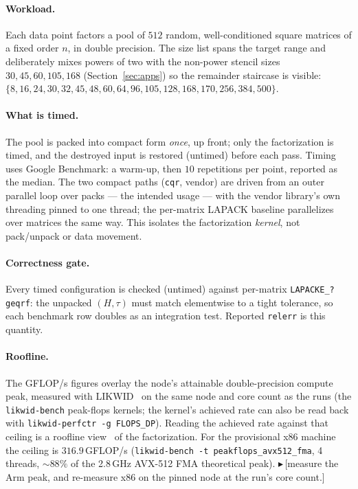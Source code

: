 \documentclass[11pt]{article}
\newif\ifdraftmode \draftmodetrue
\newcommand{\draftnote}[1]{\ifdraftmode{\textcolor{orange!85!black}{\small$\blacktriangleright$\,\textsf{[#1]}}}\fi}
\newcommand{\code}[1]{\texttt{#1}}
\newcommand{\cqr}{\mbox{\texttt{cqr}}}
\begin{document}
\paragraph{Workload.}
Each data point factors a pool of $512$ random, well-conditioned square matrices
of a fixed order $n$, in double precision. The
size list spans the target range and deliberately mixes powers of two with the
non-power stencil sizes $30,45,60,105,168$ (Section~\ref{sec:apps}) so the
remainder staircase is visible: $\{8,16,24,30,32,45,48,60,64,96,105,128,168,170,256,384,500\}$.

\paragraph{What is timed.}
The pool is packed into compact form \emph{once}, up front; only the
factorization is timed, and the destroyed input is restored (untimed) before each
pass. Timing uses Google Benchmark: a warm-up, then $10$ repetitions per point,
reported as the median. The two compact
paths (\cqr{}, vendor) are driven from an outer parallel loop over packs --- the
intended usage --- with the vendor library's own threading pinned to one thread;
the per-matrix LAPACK baseline parallelizes over matrices the same way. This
isolates the factorization \emph{kernel}, not pack/unpack or data movement.

\paragraph{Correctness gate.}
Every timed configuration is checked (untimed) against per-matrix
\code{LAPACKE\_?geqrf}: the unpacked $(H,\tau)$ must match elementwise to a tight
tolerance, so each benchmark row doubles as an integration test. Reported
\code{relerr} is this quantity.

\paragraph{Roofline.}
The GFLOP/s figures overlay the node's attainable double-precision compute
peak, measured with LIKWID~\cite{likwid2010} on the same node and core count as
the runs (the \code{likwid-bench} peak-flops kernels; the kernel's achieved rate
can also be read back with \code{likwid-perfctr -g FLOPS\_DP}). Reading the
achieved rate against that ceiling is a roofline view~\cite{roofline2009} of the
factorization. For the provisional x86 machine the ceiling is $316.9$\,GFLOP/s
(\code{likwid-bench -t peakflops\_avx512\_fma}, 4 threads, ${\sim}88\%$ of the
2.8\,GHz AVX-512 FMA theoretical peak). \draftnote{measure the Arm peak, and
re-measure x86 on the pinned node at the run's core count.}
\end{document}
